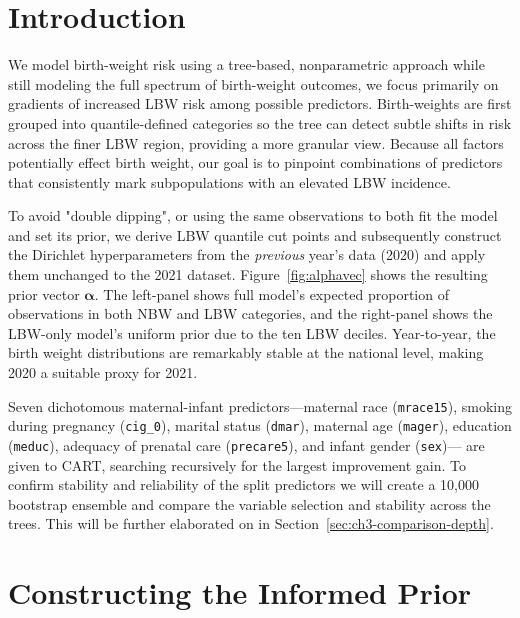 \section{Introduction}
\label{sec:ch3-introduction}
We model birth-weight risk using a tree-based, nonparametric approach while still modeling the full spectrum of birth-weight outcomes, we focus primarily on gradients of increased LBW risk among possible predictors. Birth-weights are first grouped into quantile-defined categories so the tree can detect subtle shifts in risk across the finer LBW region, providing a more granular view. Because all factors potentially effect birth weight, our goal is to pinpoint combinations of predictors that consistently mark subpopulations with an elevated LBW incidence. 

To avoid "double dipping", or using the same observations to both fit the model and set its prior, we derive LBW quantile cut points and subsequently construct the Dirichlet hyperparameters from the \emph{previous} year's data (2020) and apply them unchanged to the 2021 dataset. Figure~\ref{fig:alphavec} shows the resulting prior vector \(\boldsymbol\alpha\). The left-panel shows full model's expected proportion of observations in both NBW and LBW categories, and the right-panel shows the LBW-only model's uniform prior due to the ten LBW deciles. Year-to-year, the birth weight distributions are remarkably stable at the national level, making 2020 a suitable proxy for 2021.

Seven dichotomous maternal-infant predictors—maternal race (\texttt{mrace15}), smoking during pregnancy (\texttt{cig\_0}), marital status (\texttt{dmar}), maternal age (\texttt{mager}), education (\texttt{meduc}), adequacy of prenatal care (\texttt{precare5}), and infant gender (\texttt{sex})— are given to CART, searching recursively for the largest improvement gain. To confirm stability and reliability of the split predictors we will create a 10,000 bootstrap ensemble and compare the variable selection and stability across the trees. This will be further elaborated on in Section~\ref{sec:ch3-comparison-depth}. 

\section{Constructing the Informed Prior}
\label{sec:ch3-prior}

